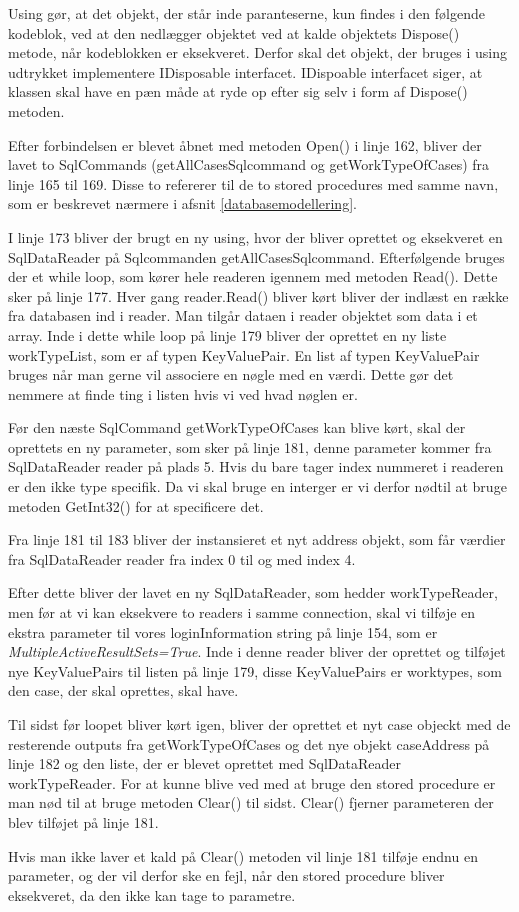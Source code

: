 Using gør, at det objekt, der står inde paranteserne, kun findes i den følgende kodeblok, ved at den nedlægger objektet ved at kalde objektets Dispose() metode, når kodeblokken er eksekveret.
Derfor skal det objekt, der bruges i using udtrykket implementere IDisposable interfacet.\cite{using} IDispoable interfacet siger, at klassen skal have en pæn måde at ryde op efter sig selv i form af Dispose() metoden.\cite{idisposable}

Efter forbindelsen er blevet åbnet med metoden Open() i linje 162, bliver der lavet to SqlCommands (getAllCasesSqlcommand og getWorkTypeOfCases) fra linje 165 til 169.
Disse to refererer til de to stored procedures med samme navn, som er beskrevet nærmere i afsnit \ref{databasemodellering}.

I linje 173 bliver der brugt en ny using, hvor der bliver oprettet og eksekveret en SqlDataReader på Sqlcommanden getAllCasesSqlcommand.
Efterfølgende bruges der et while loop, som kører hele readeren igennem med metoden Read().
Dette sker på linje 177.
Hver gang reader.Read() bliver kørt bliver der indlæst en række fra databasen ind i reader.
Man tilgår dataen i reader objektet som data i et array.
Inde i dette while loop på linje 179 bliver der oprettet en ny liste workTypeList, som er af typen KeyValuePair.
En list af typen KeyValuePair bruges når man gerne vil associere en nøgle med en værdi.
Dette gør det nemmere at finde ting i listen hvis vi ved hvad nøglen er.

Før den næste SqlCommand getWorkTypeOfCases kan blive kørt, skal der oprettets en ny parameter, som sker på linje 181, denne parameter kommer fra SqlDataReader reader på plads 5.
Hvis du bare tager index nummeret i readeren er den ikke type specifik.
Da vi skal bruge en interger er vi derfor nødtil at bruge metoden GetInt32() for at specificere det.\cite{sqlreader}

Fra linje 181 til 183 bliver der instansieret et nyt address objekt, som får værdier fra SqlDataReader reader fra index 0 til og med index 4.

Efter dette bliver der lavet en ny SqlDataReader, som hedder workTypeReader, men før at vi kan eksekvere to readers i samme connection, skal vi tilføje en ekstra parameter til vores loginInformation string på linje 154, som er \textit{MultipleActiveResultSets=True}.
Inde i denne reader bliver der oprettet og tilføjet nye KeyValuePairs til listen på linje 179, disse KeyValuePairs er worktypes, som den case, der skal oprettes, skal have.

Til sidst før loopet bliver kørt igen, bliver der oprettet et nyt case objeckt med de resterende outputs fra getWorkTypeOfCases og det nye objekt caseAddress på linje 182 og den liste, der er blevet oprettet med SqlDataReader workTypeReader.
For at kunne blive ved med at bruge den stored procedure er man nød til at bruge metoden Clear() til sidst.
Clear() fjerner parameteren der blev tilføjet på linje 181.

Hvis man ikke laver et kald på Clear() metoden vil linje 181 tilføje endnu en parameter, og der vil derfor ske en fejl, når den stored procedure bliver eksekveret, da den ikke kan tage to parametre.
